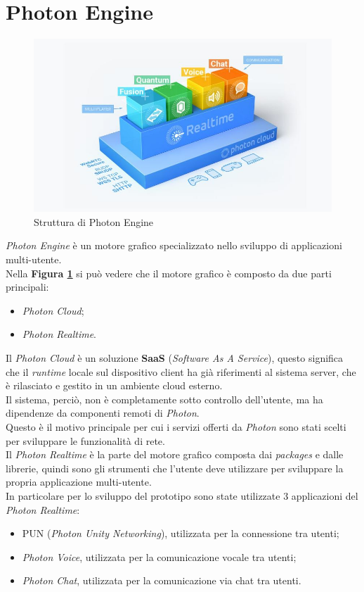 \section{Photon Engine}
\begin{figure}[H]
    \centering
    \includegraphics[scale = 0.7]{Immagini/PhotonStructure.jpg}
    \caption{Struttura di Photon Engine}
    \label{fig:3.11}
\end{figure}
\textit{Photon Engine\cite{Photon}} è un motore grafico specializzato nello sviluppo di applicazioni multi-utente.
\\Nella \textbf{Figura \ref{fig:3.11}} si può vedere che il motore grafico è composto da due parti principali:
\begin{itemize}
    \item \textit{Photon Cloud};
    \item \textit{Photon Realtime}.
\end{itemize}
Il \textit{Photon Cloud} è un soluzione \textbf{SaaS} (\textit{Software As A Service}), questo significa che il \textit{\gls{runtime}} locale sul dispositivo client ha già riferimenti al sistema server, che è rilasciato e gestito in un ambiente cloud esterno. \\Il sistema, perciò, non è completamente sotto controllo dell'utente, ma ha dipendenze da componenti remoti di \textit{Photon}.
\\Questo è il motivo principale per cui i servizi offerti da \textit{Photon} sono stati scelti per sviluppare le funzionalità di rete.
\\Il \textit{Photon Realtime} è la parte del motore grafico composta dai \textit{packages} e dalle librerie, quindi sono gli strumenti che l'utente deve utilizzare per sviluppare la propria applicazione multi-utente.
\\In particolare per lo sviluppo del prototipo sono state utilizzate 3 applicazioni del \textit{Photon Realtime}:
\begin{itemize}
    \item PUN (\textit{Photon Unity Networking}), utilizzata per la connessione tra utenti;
    \item \textit{Photon Voice}, utilizzata per la comunicazione vocale tra utenti;
    \item \textit{Photon Chat}, utilizzata per la comunicazione via chat tra utenti.
\end{itemize}

